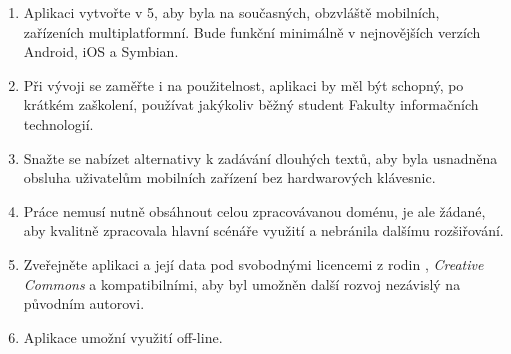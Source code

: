 \begin{enumerate}
 \item Aplikaci vytvořte v 5, aby byla na současných, obzvláště mobilních, zařízeních multiplatformní. Bude funkční minimálně v nejnovějších verzích  Android, iOS a Symbian.
 \item Při vývoji se zaměřte i na použitelnost, aplikaci by měl být schopný, po krátkém zaškolení, používat jakýkoliv běžný student Fakulty informačních technologií.
 \item Snažte se nabízet alternativy k zadávání dlouhých textů, aby byla usnadněna obsluha uživatelům mobilních zařízení bez hardwarových klávesnic.
 \item Práce nemusí nutně obsáhnout celou zpracovávanou doménu, je ale žádané, aby kvalitně zpracovala hlavní scénáře využití a nebránila dalšímu rozšiřování.
 \item Zveřejněte aplikaci a její data pod svobodnými licencemi z rodin , \emph{Creative Commons} a kompatibilními, aby byl umožněn další rozvoj nezávislý na původním autorovi.
 \item Aplikace umožní využití off-line. 
\end{enumerate}


